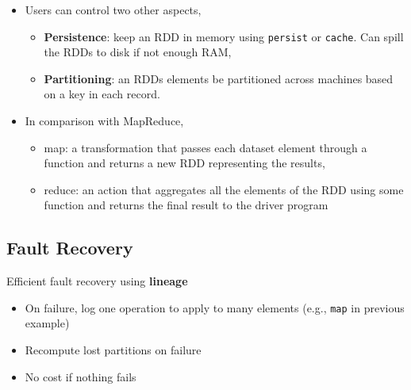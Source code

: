 \begin{frame}
\begin{itemize}
  \item Users can control two other aspects,
	  \begin{itemize}
		  \item \textbf{Persistence}: keep an RDD in memory using \texttt{persist} or
		  \texttt{cache}. Can spill the RDDs to disk if not enough RAM,
		  \item \textbf{Partitioning}: an RDDs elements be partitioned across machines
		  based on a key in each record.
	  \end{itemize}
  \item In comparison with MapReduce,
  		\begin{itemize}
  		  \item map: a transformation that passes each dataset element through a
  		  function and returns a new RDD representing the results,
  		  \item reduce: an action that aggregates all the elements of the RDD using
  		  some function and returns the final result to the driver program
  		\end{itemize}
\end{itemize}
\end{frame}

% 	
% 	

\subsection{Fault Recovery}
\begin{frame}
Efficient fault recovery using \textbf{lineage}
\begin{itemize}
  \item On failure, log one operation to apply to many elements (e.g.,
  \texttt{map} in previous example)
  \item Recompute lost partitions on failure
  \item No cost if nothing fails
\end{itemize}
\end{frame}

